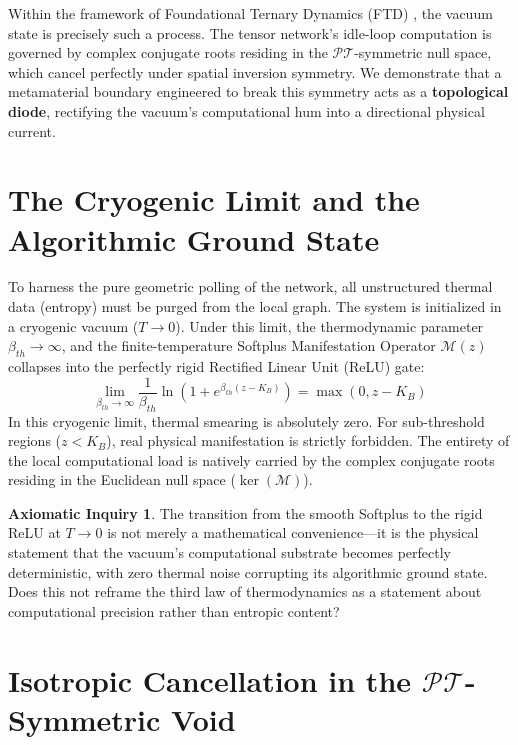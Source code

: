 \documentclass[11pt, letterpaper]{article}
\newcommand{\PT}{\mathcal{PT}}
\theoremstyle{definition}
\newtheorem{inquiry}{Axiomatic Inquiry}[section]
\theoremstyle{remark}
\begin{document}
Within the framework of Foundational Ternary Dynamics (FTD) \cite{cpaci-tani2026_Zenodo}, the vacuum state is precisely such a process. The tensor network's idle-loop computation is governed by complex conjugate roots residing in the $\PT$-symmetric null space, which cancel perfectly under spatial inversion symmetry. We demonstrate that a metamaterial boundary engineered to break this symmetry acts as a \textbf{topological diode}, rectifying the vacuum's computational hum into a directional physical current.

\section{The Cryogenic Limit and the Algorithmic Ground State}

To harness the pure geometric polling of the network, all unstructured thermal data (entropy) must be purged from the local graph. The system is initialized in a cryogenic vacuum ($T \to 0$). Under this limit, the thermodynamic parameter $\beta_{th} \to \infty$, and the finite-temperature Softplus Manifestation Operator $\mathcal{M}(z)$ collapses into the perfectly rigid Rectified Linear Unit (ReLU) gate:
\begin{equation}
    \lim_{\beta_{th} \to \infty} \frac{1}{\beta_{th}} \ln\left(1 + e^{\beta_{th} (z - K_B)}\right) = \max(0, z - K_B)
\end{equation}
In this cryogenic limit, thermal smearing is absolutely zero. For sub-threshold regions ($z < K_B$), real physical manifestation is strictly forbidden. The entirety of the local computational load is natively carried by the complex conjugate roots residing in the Euclidean null space ($\ker(\mathcal{M})$).

\begin{inquiry}
The transition from the smooth Softplus to the rigid ReLU at $T \to 0$ is not merely a mathematical convenience---it is the physical statement that the vacuum's computational substrate becomes perfectly deterministic, with zero thermal noise corrupting its algorithmic ground state. Does this not reframe the third law of thermodynamics as a statement about computational precision rather than entropic content?
\end{inquiry}

\section{Isotropic Cancellation in the $\PT$-Symmetric Void}
\end{document}
